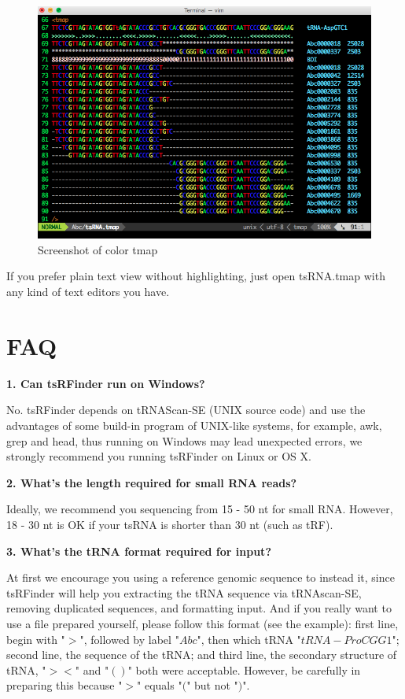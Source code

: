\documentclass[11pt, a4paper]{article}
\begin{document}
\begin{figure}[htbp]
\begin{center}
\includegraphics[width=12cm]{tmap.png}
\caption{Screenshot of color tmap} 
\label{tmap}
\end{center}
\end{figure}

If you prefer plain text view without highlighting, just open tsRNA.tmap with any kind of text editors you have.

\section{FAQ}

\textbf{1. Can tsRFinder run on Windows?}

No. tsRFinder depends on tRNAScan-SE (UNIX source code) and use the advantages of some build-in program of UNIX-like systems, for example, awk, grep and head, thus running on Windows may lead unexpected errors, we strongly recommend you running tsRFinder on Linux or OS X.

\textbf{2. What's the length required for small RNA reads?}

Ideally, we recommend you sequencing from 15 - 50 nt for small RNA. However, 18 - 30 nt is OK if your tsRNA is shorter than 30 nt (such as tRF).

\textbf{3. What's the tRNA format required for input?}

At first we encourage you using a reference genomic sequence to instead it, since tsRFinder will help you extracting the tRNA sequence via tRNAscan-SE, removing duplicated sequences, and formatting input. And if you really want to use a file prepared yourself, please follow this format (see the example): first line, begin with "$>$", followed by label "$Abc$", then which tRNA "$tRNA-ProCGG1$"; second line, the sequence of the tRNA; and third line, the secondary structure of tRNA, "$><$" and "$()$" both were acceptable. However, be carefully in preparing this because "$>$" equals "$($" but not "$)$".
\end{document}
